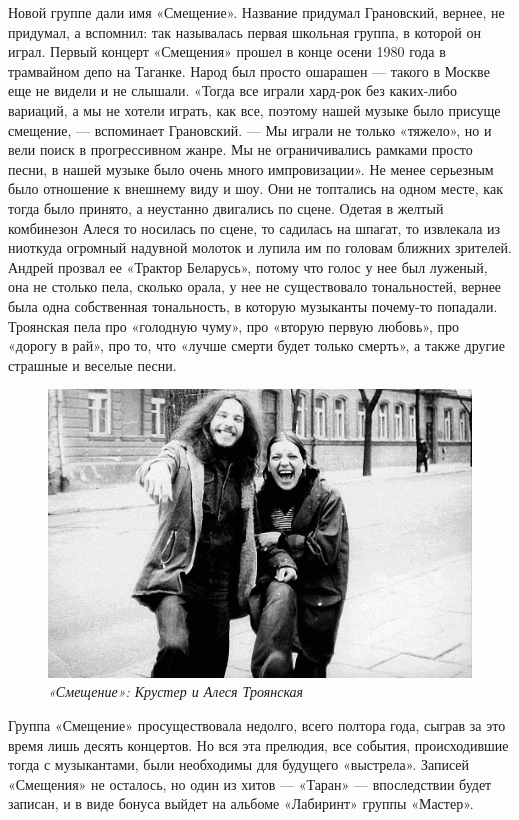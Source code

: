 \documentclass[16pt,a5paper,oneside]{book}
\begin{document}
Новой группе дали имя «Смещение». Название придумал Грановский, вернее, не придумал, а вспомнил: так называлась первая
школьная группа, в которой он играл. Первый концерт «Смещения» прошел в конце осени 1980 года в трамвайном депо на
Таганке. Народ был просто ошарашен — такого в Москве еще не видели и не слышали. «Тогда все играли хард-рок без
каких-либо вариаций, а мы не хотели играть, как все, поэтому нашей музыке было присуще смещение, — вспоминает
Грановский. — Мы играли не только «тяжело», но и вели поиск в прогрессивном жанре. Мы не ограничивались рамками просто
песни, в нашей музыке было очень много импровизации». Не менее серьезным было отношение к внешнему виду и шоу. Они не
топтались на одном месте, как тогда было принято, а неустанно двигались по сцене. Одетая в желтый комбинезон Алеся то
носилась по сцене, то садилась на шпагат, то извлекала из ниоткуда огромный надувной молоток и лупила им по головам
ближних зрителей. Андрей прозвал ее «Трактор Беларусь», потому что голос у нее был луженый, она не столько пела, сколько
орала, у нее не существовало тональностей, вернее была одна собственная тональность, в которую музыканты почему-то
попадали. Троянская пела про «голодную чуму», про «вторую первую любовь», про «дорогу в рай», про то, что «лучше смерти
будет только смерть», а также другие страшные и веселые песни.

\begin{figure}
    \centering
    \includegraphics[scale=0.9]{Image08}
    \caption{\textit{«Смещение»: Крустер и Алеся Троянская}}
\end{figure}

Группа «Смещение» просуществовала недолго, всего полтора года, сыграв за это время лишь десять концертов. Но вся эта
прелюдия, все события, происходившие тогда с музыкантами, были необходимы для будущего «выстрела». Записей «Смещения» не
осталось, но один из хитов — «Таран» — впоследствии будет записан, и в виде бонуса выйдет на альбоме «Лабиринт» группы
«Мастер».
\end{document}
